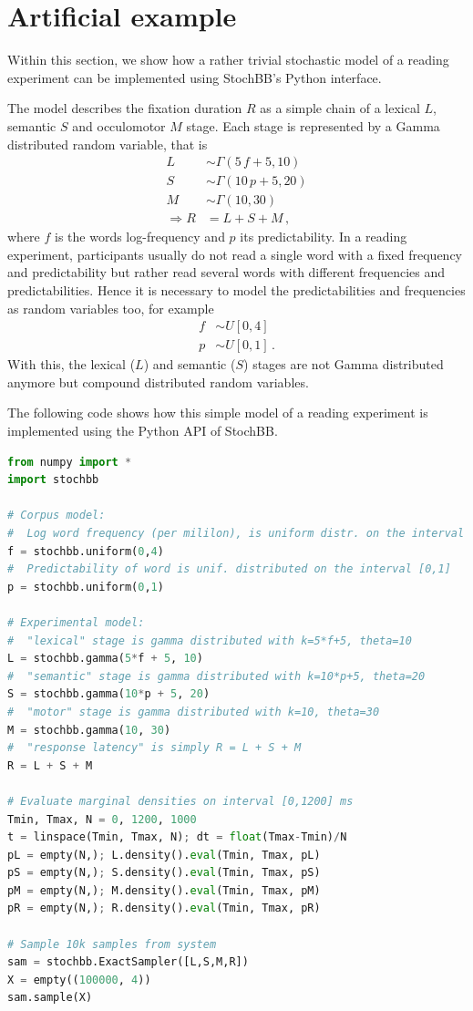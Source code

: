 \section{Artificial example} \label{sec:example}
Within this section, we show how a rather trivial stochastic model of a reading experiment can be
implemented using StochBB's Python interface.

The model describes the fixation duration $R$ as a simple chain of a lexical $L$, semantic $S$ and
occulomotor $M$ stage. Each stage is represented by a Gamma distributed random variable, that is
\begin{align*}
 L &\sim \Gamma(5\,f+5, 10)\\
 S &\sim \Gamma(10\,p+5, 20)\\
 M &\sim \Gamma(10, 30)\\
 \Rightarrow R &= L+S+M\,,
\end{align*} 
where $f$ is the words log-frequency and $p$ its predictability. In a reading experiment, 
participants usually do not read a single word with a fixed frequency and predictability but
rather read several words with different frequencies and predictabilities. Hence it is necessary
to model the predictabilities and frequencies as random variables too, for example
\begin{align*}
 f &\sim U[0,4]\\
 p &\sim U[0,1]\,.
\end{align*}
With this, the lexical ($L$) and semantic ($S$) stages are not Gamma distributed anymore but
compound distributed random variables. 

The following code shows how this simple model of a reading experiment is implemented using the
Python API of StochBB.

\begin{lstlisting}[language=Python]
from numpy import *
import stochbb

# Corpus model:
#  Log word frequency (per mililon), is uniform distr. on the interval [0,4]
f = stochbb.uniform(0,4)
#  Predictability of word is unif. distributed on the interval [0,1]
p = stochbb.uniform(0,1)

# Experimental model:
#  "lexical" stage is gamma distributed with k=5*f+5, theta=10
L = stochbb.gamma(5*f + 5, 10)
#  "semantic" stage is gamma distributed with k=10*p+5, theta=20
S = stochbb.gamma(10*p + 5, 20)
#  "motor" stage is gamma distributed with k=10, theta=30
M = stochbb.gamma(10, 30)
#  "response latency" is simply R = L + S + M
R = L + S + M

# Evaluate marginal densities on interval [0,1200] ms
Tmin, Tmax, N = 0, 1200, 1000
t = linspace(Tmin, Tmax, N); dt = float(Tmax-Tmin)/N
pL = empty(N,); L.density().eval(Tmin, Tmax, pL)
pS = empty(N,); S.density().eval(Tmin, Tmax, pS)
pM = empty(N,); M.density().eval(Tmin, Tmax, pM)
pR = empty(N,); R.density().eval(Tmin, Tmax, pR)

# Sample 10k samples from system
sam = stochbb.ExactSampler([L,S,M,R])
X = empty((100000, 4))
sam.sample(X)
\end{lstlisting}

